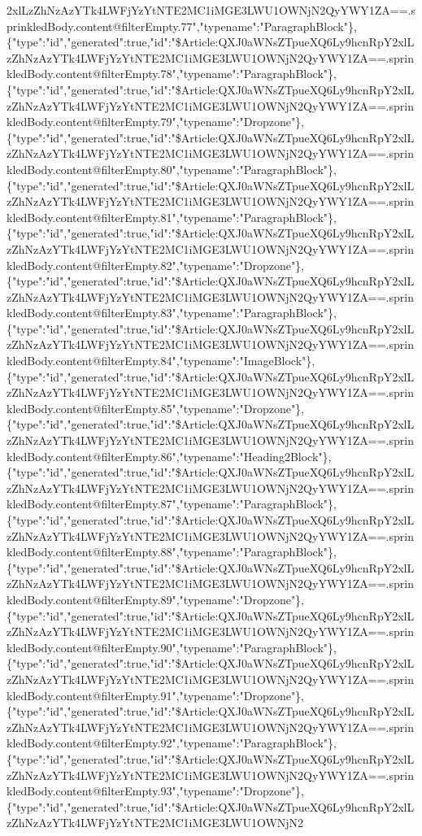 2xlLzZhNzAzYTk4LWFjYzYtNTE2MC1iMGE3LWU1OWNjN2QyYWY1ZA==.sprinkledBody.content@filterEmpty.77","typename":"ParagraphBlock"\},\{"type":"id","generated":true,"id":"\$Article:QXJ0aWNsZTpueXQ6Ly9hcnRpY2xlLzZhNzAzYTk4LWFjYzYtNTE2MC1iMGE3LWU1OWNjN2QyYWY1ZA==.sprinkledBody.content@filterEmpty.78","typename":"ParagraphBlock"\},\{"type":"id","generated":true,"id":"\$Article:QXJ0aWNsZTpueXQ6Ly9hcnRpY2xlLzZhNzAzYTk4LWFjYzYtNTE2MC1iMGE3LWU1OWNjN2QyYWY1ZA==.sprinkledBody.content@filterEmpty.79","typename":"Dropzone"\},\{"type":"id","generated":true,"id":"\$Article:QXJ0aWNsZTpueXQ6Ly9hcnRpY2xlLzZhNzAzYTk4LWFjYzYtNTE2MC1iMGE3LWU1OWNjN2QyYWY1ZA==.sprinkledBody.content@filterEmpty.80","typename":"ParagraphBlock"\},\{"type":"id","generated":true,"id":"\$Article:QXJ0aWNsZTpueXQ6Ly9hcnRpY2xlLzZhNzAzYTk4LWFjYzYtNTE2MC1iMGE3LWU1OWNjN2QyYWY1ZA==.sprinkledBody.content@filterEmpty.81","typename":"ParagraphBlock"\},\{"type":"id","generated":true,"id":"\$Article:QXJ0aWNsZTpueXQ6Ly9hcnRpY2xlLzZhNzAzYTk4LWFjYzYtNTE2MC1iMGE3LWU1OWNjN2QyYWY1ZA==.sprinkledBody.content@filterEmpty.82","typename":"Dropzone"\},\{"type":"id","generated":true,"id":"\$Article:QXJ0aWNsZTpueXQ6Ly9hcnRpY2xlLzZhNzAzYTk4LWFjYzYtNTE2MC1iMGE3LWU1OWNjN2QyYWY1ZA==.sprinkledBody.content@filterEmpty.83","typename":"ParagraphBlock"\},\{"type":"id","generated":true,"id":"\$Article:QXJ0aWNsZTpueXQ6Ly9hcnRpY2xlLzZhNzAzYTk4LWFjYzYtNTE2MC1iMGE3LWU1OWNjN2QyYWY1ZA==.sprinkledBody.content@filterEmpty.84","typename":"ImageBlock"\},\{"type":"id","generated":true,"id":"\$Article:QXJ0aWNsZTpueXQ6Ly9hcnRpY2xlLzZhNzAzYTk4LWFjYzYtNTE2MC1iMGE3LWU1OWNjN2QyYWY1ZA==.sprinkledBody.content@filterEmpty.85","typename":"Dropzone"\},\{"type":"id","generated":true,"id":"\$Article:QXJ0aWNsZTpueXQ6Ly9hcnRpY2xlLzZhNzAzYTk4LWFjYzYtNTE2MC1iMGE3LWU1OWNjN2QyYWY1ZA==.sprinkledBody.content@filterEmpty.86","typename":"Heading2Block"\},\{"type":"id","generated":true,"id":"\$Article:QXJ0aWNsZTpueXQ6Ly9hcnRpY2xlLzZhNzAzYTk4LWFjYzYtNTE2MC1iMGE3LWU1OWNjN2QyYWY1ZA==.sprinkledBody.content@filterEmpty.87","typename":"ParagraphBlock"\},\{"type":"id","generated":true,"id":"\$Article:QXJ0aWNsZTpueXQ6Ly9hcnRpY2xlLzZhNzAzYTk4LWFjYzYtNTE2MC1iMGE3LWU1OWNjN2QyYWY1ZA==.sprinkledBody.content@filterEmpty.88","typename":"ParagraphBlock"\},\{"type":"id","generated":true,"id":"\$Article:QXJ0aWNsZTpueXQ6Ly9hcnRpY2xlLzZhNzAzYTk4LWFjYzYtNTE2MC1iMGE3LWU1OWNjN2QyYWY1ZA==.sprinkledBody.content@filterEmpty.89","typename":"Dropzone"\},\{"type":"id","generated":true,"id":"\$Article:QXJ0aWNsZTpueXQ6Ly9hcnRpY2xlLzZhNzAzYTk4LWFjYzYtNTE2MC1iMGE3LWU1OWNjN2QyYWY1ZA==.sprinkledBody.content@filterEmpty.90","typename":"ParagraphBlock"\},\{"type":"id","generated":true,"id":"\$Article:QXJ0aWNsZTpueXQ6Ly9hcnRpY2xlLzZhNzAzYTk4LWFjYzYtNTE2MC1iMGE3LWU1OWNjN2QyYWY1ZA==.sprinkledBody.content@filterEmpty.91","typename":"Dropzone"\},\{"type":"id","generated":true,"id":"\$Article:QXJ0aWNsZTpueXQ6Ly9hcnRpY2xlLzZhNzAzYTk4LWFjYzYtNTE2MC1iMGE3LWU1OWNjN2QyYWY1ZA==.sprinkledBody.content@filterEmpty.92","typename":"ParagraphBlock"\},\{"type":"id","generated":true,"id":"\$Article:QXJ0aWNsZTpueXQ6Ly9hcnRpY2xlLzZhNzAzYTk4LWFjYzYtNTE2MC1iMGE3LWU1OWNjN2QyYWY1ZA==.sprinkledBody.content@filterEmpty.93","typename":"Dropzone"\},\{"type":"id","generated":true,"id":"\$Article:QXJ0aWNsZTpueXQ6Ly9hcnRpY2xlLzZhNzAzYTk4LWFjYzYtNTE2MC1iMGE3LWU1OWNjN2